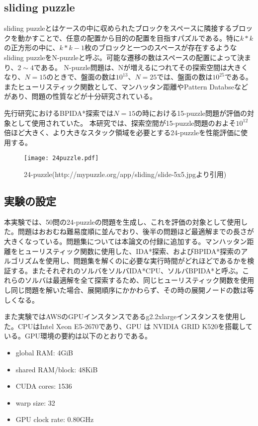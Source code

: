 \documentclass[a4paper,11pt,oneside,openany]{jsbook}
\begin{document}
\subsection{sliding puzzle}
sliding puzzleとはケースの中に収められたブロックをスペースに隣接するブロックを動かすことで、任意の配置から目的の配置を目指すパズルである。特に$k * k$の正方形の中に、$ k * k - 1$枚のブロックと一つのスペースが存在するようなsliding puzzleをN-puzzleと呼ぶ。可能な遷移の数はスペースの配置によって決まり、$2\sim4$である。
N-puzzle問題は、Nが増えるにつれてその探索空間は大きくなり、$N=15$のときで、盤面の数は$10^{13}$、$N=25$では、盤面の数は$10^{25}$である。
またヒューリスティック関数として、マンハッタン距離やPattern Databseなどがあり、問題の性質などが十分研究されている。

先行研究におけるBPIDA*探索\cite{HA17}では$N=15$の時における15-puzzle問題が評価の対象として使用されていた。
本研究では、探索空間が15-puzzle問題のおよそ$10^{12}$倍ほど大きく、より大きなスタック領域を必要とする24-puzzleを性能評価に使用する。
\begin{figure}[htbp]
\begin{center}
\texttt{[image: 24puzzle.pdf]}
\caption{24-puzzle(http://mypuzzle.org/app/sliding/slide-5x5.jpgより引用)}
\end{center}
\end{figure}


\subsection{実験の設定}
本実験では、50問の24-puzzleの問題を生成し、これを評価の対象として使用した。問題はおおむね難易度順に並んでおり、後半の問題ほど最適解までの長さが大きくなっている。問題集については本論文の付録に追加する。マンハッタン距離をヒューリスティック関数に使用した、IDA*探索、およびBPIDA*探索\cite{HA17}のアルゴリズムを使用し、問題集を解くのに必要な実行時間がどれほどであるかを検証する。またそれぞれのソルバをソルバIDA*CPU、ソルバBPIDA*と呼ぶ。これらのソルバは最適解を全て探索するため、同じヒューリスティック関数を使用し同じ問題を解いた場合、展開順序にかかわらず、その時の展開ノードの数は等しくなる。

また実験ではAWSのGPUインスタンスであるg2.2xlargeインスタンスを使用した。CPUはIntel Xeon E5-2670であり、GPU
は NVIDIA GRID K520を搭載している。GPU環境の要約は以下のとおりである。
\begin{itemize}
 \item global RAM: 4GiB
 \item shared RAM/block: 48KiB
 \item CUDA cores: 1536
 \item warp size: 32
 \item GPU clock rate: 0.80GHz
\end{itemize}
\end{document}
